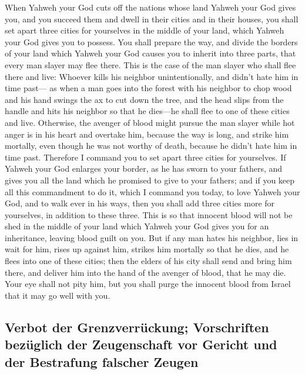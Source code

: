  When Yahweh your God cuts off the nations whose land
Yahweh your God gives you, and you succeed them and dwell in their
cities and in their houses,  you shall set apart three
cities for yourselves in the middle of your land, which Yahweh your God
gives you to possess.  You shall prepare the way, and
divide the borders of your land which Yahweh your God causes you to
inherit into three parts, that every man slayer may flee there.
 This is the case of the man slayer who shall flee there
and live: Whoever kills his neighbor unintentionally, and didn't hate
him in time past---  as when a man goes into the forest
with his neighbor to chop wood and his hand swings the ax to cut down
the tree, and the head slips from the handle and hits his neighbor so
that he dies---he shall flee to one of these cities and live.
 Otherwise, the avenger of blood might pursue the man
slayer while hot anger is in his heart and overtake him, because the way
is long, and strike him mortally, even though he was not worthy of
death, because he didn't hate him in time past.  Therefore
I command you to set apart three cities for yourselves. 
If Yahweh your God enlarges your border, as he has sworn to your
fathers, and gives you all the land which he promised to give to your
fathers;  and if you keep all this commandment to do it,
which I command you today, to love Yahweh your God, and to walk ever in
his ways, then you shall add three cities more for yourselves, in
addition to these three.  This is so that innocent blood
will not be shed in the middle of your land which Yahweh your God gives
you for an inheritance, leaving blood guilt on you.  But
if any man hates his neighbor, lies in wait for him, rises up against
him, strikes him mortally so that he dies, and he flees into one of
these cities;  then the elders of his city shall send and
bring him there, and deliver him into the hand of the avenger of blood,
that he may die.  Your eye shall not pity him, but you
shall purge the innocent blood from Israel that it may go well with you.

\hypertarget{verbot-der-grenzverruxfcckung-vorschriften-bezuxfcglich-der-zeugenschaft-vor-gericht-und-der-bestrafung-falscher-zeugen}{%
\subsection{Verbot der Grenzverrückung; Vorschriften bezüglich der
Zeugenschaft vor Gericht und der Bestrafung falscher
Zeugen}\label{verbot-der-grenzverruxfcckung-vorschriften-bezuxfcglich-der-zeugenschaft-vor-gericht-und-der-bestrafung-falscher-zeugen}}

